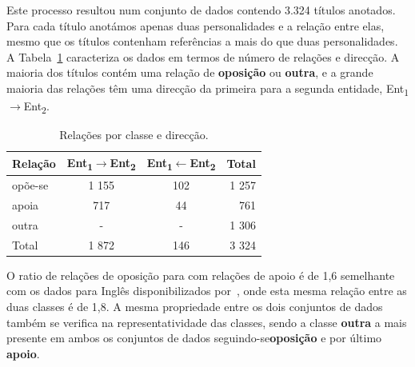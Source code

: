 \documentclass[a4paper, twocolumn, 11pt, twoside]{article}
\begin{document}
Este processo resultou num conjunto de dados contendo 3.324 títulos anotados. Para cada título anotámos apenas duas personalidades e a relação entre elas, mesmo que os títulos contenham referências a mais do que duas personalidades. A Tabela~\ref{tab:rel_dataset} caracteriza os dados em termos de número de relações e direcção. A maioria dos títulos contém uma relação de \textbf{oposição} ou \textbf{outra}, e a grande maioria das relações têm uma direcção da primeira para a segunda entidade, Ent\textsubscript{1}$\rightarrow$Ent\textsubscript{2}.


\begin{table}[!h]
    \begin{center}
    \begin{tabular}{l ccr}
        {\bf Relação} & {\bf \footnotesize{Ent\textsubscript{1}$\rightarrow$Ent\textsubscript{2}}} & {\bf \footnotesize{Ent\textsubscript{1}$\leftarrow$Ent\textsubscript{2}}} & {\bf Total} \\
        \hline
        opõe-se          &  1 155  &  102  &  1 257  \\
        apoia            &    717  &   44  &    761  \\
        outra            &    -    &   -   &  1 306  \\
		\hline
		Total			 &  1 872  &  146  &  3 324  \\
    \end{tabular}
	\caption{Relações por classe e direcção.}
	\label{tab:rel_dataset}
	\end{center}
\end{table}

O ratio de relações de oposição para com relações de apoio é de 1,6 semelhante com os dados para Inglês disponibilizados por~\cite{park-etal-2021-blames}, onde esta mesma relação entre as duas classes é de 1,8.  A mesma propriedade entre os dois conjuntos de dados também se verifica na representatividade das classes, sendo a classe \textbf{outra} a mais presente em ambos os conjuntos de dados seguindo-se\textbf{oposição} e por último \textbf{apoio}.


\end{document}
